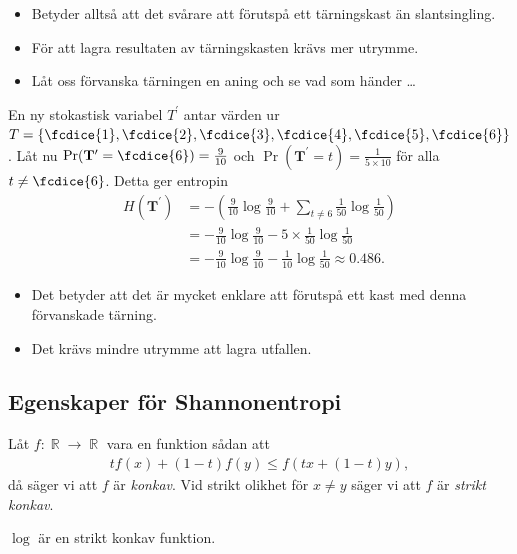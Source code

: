 \documentclass{beamer}
\DeclareMathOperator{\R}{\mathbb{R}}
\let\stoch\mathbf{}
\begin{document}
\begin{frame}
  \begin{itemize}
    \item Betyder alltså att det svårare att förutspå ett tärningskast än 
      slantsingling.

    \item För att lagra resultaten av tärningskasten krävs mer utrymme.

    \item Låt oss förvanska tärningen en aning och se vad som händer \dots
  \end{itemize}
\end{frame}

\begin{frame}
  \begin{example}
    En ny stokastisk variabel \(T^\prime\) antar värden ur \(T = \{\fcdice{1}, 
      \fcdice{2}, \fcdice{3}, \fcdice{4}, \fcdice{5}, \fcdice{6}\}\).
    Låt nu \(\Pr(\stoch T^\prime = \fcdice{6}) = \frac{9}{10}\) och 
    \(\Pr(\stoch T^\prime = t) = \frac{1}{5\times 10}\) för alla \(t\neq 
      \fcdice{6}\).
    Detta ger entropin
    \begin{align*}
      H(\stoch T^\prime) &= -\left( \frac{9}{10}\log\frac{9}{10} + \sum_{t\neq 
      6} \frac{1}{50}\log\frac{1}{50} \right) \\
        &= -\frac{9}{10}\log\frac{9}{10} -5\times\frac{1}{50}\log\frac{1}{50} 
        \\
        &= -\frac{9}{10}\log\frac{9}{10} -\frac{1}{10}\log\frac{1}{50} \approx 
        0.486.
    \end{align*}
  \end{example}
\end{frame}

\begin{frame}
  \begin{itemize}
    \item Det betyder att det är mycket enklare att förutspå ett kast med denna 
      förvanskade tärning.
    \item Det krävs mindre utrymme att lagra utfallen.
  \end{itemize}
\end{frame}

\subsection{Egenskaper för Shannonentropi}

\begin{frame}
  \begin{definition}
    Låt \(f\colon \R\to \R\) vara en funktion sådan att
    \begin{align*}
      tf(x) + (1-t)f(y) \leq f(tx + (1-t)y),
    \end{align*}
    då säger vi att \(f\) är \emph{konkav}.
    Vid strikt olikhet för \(x\neq y\) säger vi att \(f\) är \emph{strikt 
    konkav}.
  \end{definition}

  \begin{example}
    \(\log\) är en strikt konkav funktion.
  \end{example}
\end{frame}
\end{document}
